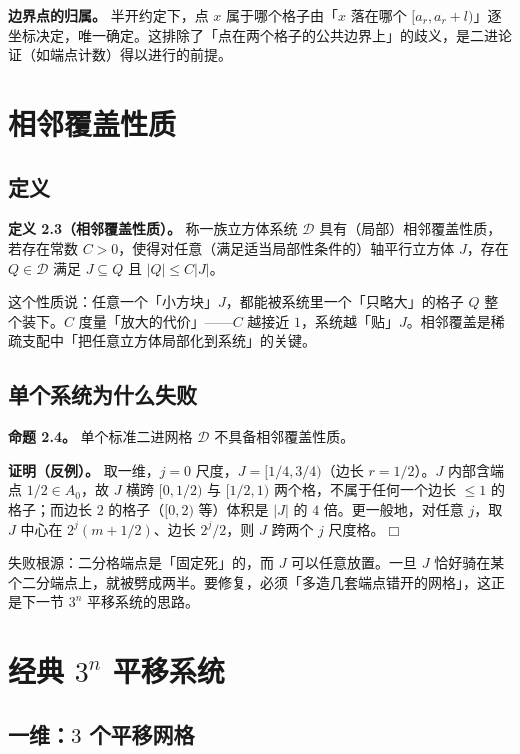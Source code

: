 \documentclass[a4paper,11pt,openany]{ctexbook}
\numberwithin{equation}{chapter}
\numberwithin{figure}{chapter}
\numberwithin{table}{chapter}
\begin{document}
\textbf{边界点的归属。} 半开约定下，点 $x$ 属于哪个格子由「$x$ 落在哪个 $[a_r,a_r+l)$」逐坐标决定，唯一确定。这排除了「点在两个格子的公共边界上」的歧义，是二进论证（如端点计数）得以进行的前提。

\section{相邻覆盖性质}

\subsection{定义}

\textbf{定义 2.3（相邻覆盖性质）。} 称一族立方体系统 $\mathcal D$ 具有（局部）相邻覆盖性质，若存在常数 $C>0$，使得对任意（满足适当局部性条件的）轴平行立方体 $J$，存在 $Q\in\mathcal D$ 满足 $J\subseteq Q$ 且 $|Q|\le C|J|$。

\begin{intuitionbox}
这个性质说：任意一个「小方块」$J$，都能被系统里一个「只略大」的格子 $Q$ 整个装下。$C$ 度量「放大的代价」——$C$ 越接近 $1$，系统越「贴」$J$。相邻覆盖是稀疏支配中「把任意立方体局部化到系统」的关键。
\end{intuitionbox}

\subsection{单个系统为什么失败}

\textbf{命题 2.4。} 单个标准二进网格 $\mathcal D$ 不具备相邻覆盖性质。

\textbf{证明（反例）。} 取一维，$j=0$ 尺度，$J=[1/4,3/4)$（边长 $r=1/2$）。$J$ 内部含端点 $1/2\in A_0$，故 $J$ 横跨 $[0,1/2)$ 与 $[1/2,1)$ 两个格，不属于任何一个边长 $\le 1$ 的格子；而边长 $2$ 的格子（$[0,2)$ 等）体积是 $|J|$ 的 $4$ 倍。更一般地，对任意 $j$，取 $J$ 中心在 $2^j(m+1/2)$、边长 $2^j/2$，则 $J$ 跨两个 $j$ 尺度格。$\Box$

\begin{intuitionbox}
失败根源：二分格端点是「固定死」的，而 $J$ 可以任意放置。一旦 $J$ 恰好骑在某个二分端点上，就被劈成两半。要修复，必须「多造几套端点错开的网格」，这正是下一节 $3^n$ 平移系统的思路。
\end{intuitionbox}

\section{经典 $3^n$ 平移系统}

\subsection{一维：$3$ 个平移网格}
\end{document}
